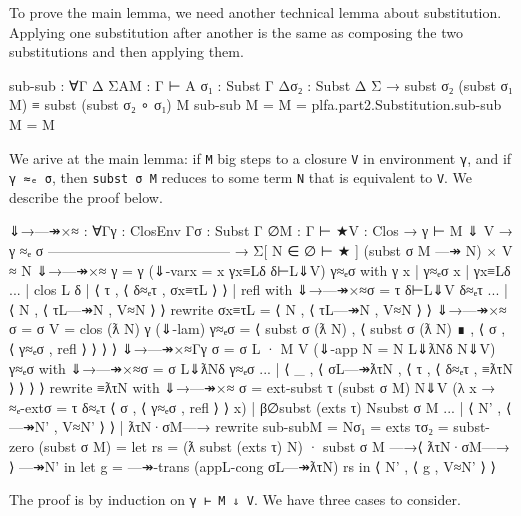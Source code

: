 To prove the main lemma, we need another technical lemma about
substitution. Applying one substitution after another is the same as
composing the two substitutions and then applying them.

\begin{fence}
\begin{code}
sub-sub : ∀{Γ Δ Σ}{A}{M : Γ ⊢ A} {σ₁ : Subst Γ Δ}{σ₂ : Subst Δ Σ}
  → subst σ₂ (subst σ₁ M) ≡ subst (subst σ₂ ∘ σ₁) M
sub-sub {M = M} = plfa.part2.Substitution.sub-sub {M = M}
\end{code}
\end{fence}

We arive at the main lemma: if \texttt{M} big steps to a closure
\texttt{V} in environment \texttt{γ}, and if \texttt{γ\ ≈ₑ\ σ}, then
\texttt{subst\ σ\ M} reduces to some term \texttt{N} that is equivalent
to \texttt{V}. We describe the proof below.

\begin{fence}
\begin{code}
⇓→—↠×≈ : ∀{Γ}{γ : ClosEnv Γ}{σ : Subst Γ ∅}{M : Γ ⊢ ★}{V : Clos}
       → γ ⊢ M ⇓ V  →  γ ≈ₑ σ
         ---------------------------------------
       → Σ[ N ∈ ∅ ⊢ ★ ] (subst σ M —↠ N) × V ≈ N
⇓→—↠×≈ {γ = γ} (⇓-var{x = x} γx≡Lδ δ⊢L⇓V) γ≈ₑσ
    with γ x | γ≈ₑσ {x} | γx≡Lδ
... | clos L δ | ⟨ τ , ⟨ δ≈ₑτ , σx≡τL ⟩ ⟩ | refl
      with ⇓→—↠×≈{σ = τ} δ⊢L⇓V δ≈ₑτ
...   | ⟨ N , ⟨ τL—↠N , V≈N ⟩ ⟩ rewrite σx≡τL =
        ⟨ N , ⟨ τL—↠N , V≈N ⟩ ⟩
⇓→—↠×≈ {σ = σ} {V = clos (ƛ N) γ} (⇓-lam) γ≈ₑσ =
    ⟨ subst σ (ƛ N) , ⟨ subst σ (ƛ N) ∎ , ⟨ σ , ⟨ γ≈ₑσ , refl ⟩ ⟩ ⟩ ⟩
⇓→—↠×≈{Γ}{γ} {σ = σ} {L · M} {V} (⇓-app {N = N} L⇓ƛNδ N⇓V) γ≈ₑσ
    with ⇓→—↠×≈{σ = σ} L⇓ƛNδ γ≈ₑσ
... | ⟨ _ , ⟨ σL—↠ƛτN , ⟨ τ , ⟨ δ≈ₑτ , ≡ƛτN ⟩ ⟩ ⟩ ⟩ rewrite ≡ƛτN
      with ⇓→—↠×≈ {σ = ext-subst τ (subst σ M)} N⇓V
             (λ {x} → ≈ₑ-ext{σ = τ} δ≈ₑτ ⟨ σ , ⟨ γ≈ₑσ , refl ⟩ ⟩ {x})
           | β{∅}{subst (exts τ) N}{subst σ M}
...   | ⟨ N' , ⟨ —↠N' , V≈N' ⟩ ⟩ | ƛτN·σM—→
        rewrite sub-sub{M = N}{σ₁ = exts τ}{σ₂ = subst-zero (subst σ M)} =
        let rs = (ƛ subst (exts τ) N) · subst σ M —→⟨ ƛτN·σM—→ ⟩ —↠N' in
        let g = —↠-trans (appL-cong σL—↠ƛτN) rs in
        ⟨ N' , ⟨ g , V≈N' ⟩ ⟩
\end{code}
\end{fence}

The proof is by induction on \texttt{γ\ ⊢\ M\ ⇓\ V}. We have three cases
to consider.

